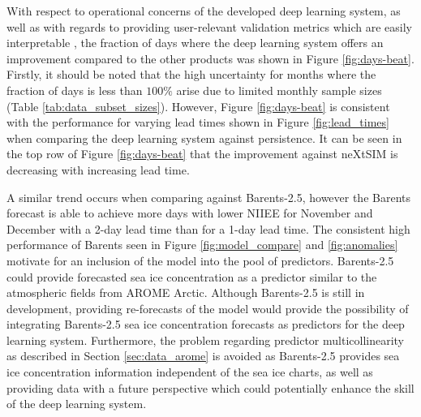\documentclass[../main/thesis]{subfiles}
\begin{document}
With respect to operational concerns of the developed deep learning system, as well as with regards to providing user-relevant validation metrics which are easily interpretable \citep{Veland2021}, the fraction of days where the deep learning system offers an improvement compared to the other products was shown in Figure \ref{fig:days-beat}. Firstly, it should be noted that the high uncertainty for months where the fraction of days is less than $100\%$ arise due to limited monthly sample sizes (Table \ref{tab:data_subset_sizes}). However, Figure \ref{fig:days-beat} is consistent with the performance for varying lead times shown in Figure \ref{fig:lead_times} when comparing the deep learning system against persistence. It can be seen in the top row of Figure \ref{fig:days-beat} that the improvement against neXtSIM is decreasing with increasing lead time. 

A similar trend occurs when comparing against Barents-2.5, however the Barents forecast is able to achieve more days with lower NIIEE for November and December with a 2-day lead time than for a 1-day lead time. The consistent high performance of Barents seen in Figure \ref{fig:model_compare} and \ref{fig:anomalies} motivate for an inclusion of the model into the pool of predictors. Barents-2.5 could provide forecasted sea ice concentration as a predictor similar to the atmospheric fields from AROME Arctic. Although Barents-2.5 is still in development, providing re-forecasts of the model would provide the possibility of integrating Barents-2.5 sea ice concentration forecasts as predictors for the deep learning system. Furthermore, the problem regarding predictor multicollinearity as described in Section \ref{sec:data_arome} is avoided as Barents-2.5 provides sea ice concentration information independent of the sea ice charts, as well as providing data with a future perspective which could potentially enhance the skill of the deep learning system.
\end{document}
